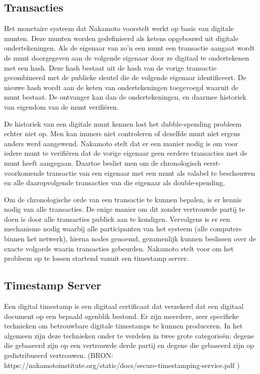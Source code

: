 	\subsection{Transacties}
	Het monetaire systeem dat Nakamoto voorstelt werkt op basis van digitale munten. Deze munten worden gedefinieerd als ketens opgebouwd uit digitale ondertekeningen. Als de eigenaar van zo’n een munt een transactie aangaat wordt de munt doorgegeven aan de volgende eigenaar door ze digitaal te ondertekenen met een hash. Deze hash bestaat uit de hash van de vorige transactie gecombineerd met de publieke sleutel die de volgende eigenaar identificeert. De nieuwe hash wordt aan de keten van ondertekeningen toegevoegd waaruit de munt bestaat. De ontvanger kan dan de ondertekeningen, en daarmee historiek van eigendom van de munt verifiëren. 
			
	De historiek van een digitale munt kennen lost het dubble-spending probleem echter niet op. Men kan immers niet controleren of dezelfde munt niet ergens anders werd aangewend. Nakamoto stelt dat er een manier nodig is om voor iedere munt te verifiëren dat de vorige eigenaar geen eerdere transacties met de munt heeft aangegaan. Daartoe beslist men om de chronologisch eerst-voorkomende transactie van een eigenaar met een munt als valabel te beschouwen en alle daaropvolgende transacties van die eigenaar als double-spending. 
			
	Om de chronologische orde van een transactie te kunnen bepalen, is er kennis nodig van alle transacties. De enige manier om dit zonder vertrouwde partij te doen is door alle transacties publiek aan te kondigen. Vervolgens is er een mechanisme nodig waarbij alle participanten van het systeem (alle computers binnen het netwerk), hierna nodes genoemd, gezamenlijk kunnen beslissen over de exacte volgorde waarin transacties gebeurden. Nakamoto stelt voor om het probleem op te lossen startend vanuit een timestamp server. 
			
	\subsection{Timestamp Server}
	Een digital timestamp is een digitaal certificaat dat verzekerd dat een digitaal document op een bepaald ogenblik bestond. Er zijn meerdere, zeer specifieke technieken om betrouwbare digitale timestamps te kunnen produceren. In het algemeen zijn deze technieken onder te verdelen in twee grote categorieën: degene die gebaseerd zijn op een vertrouwde derde partij en degene die gebaseerd zijn op gedistribueerd vertrouwen. (BRON: https://nakamotoinstitute.org/static/docs/secure-timestamping-service.pdf )
	
